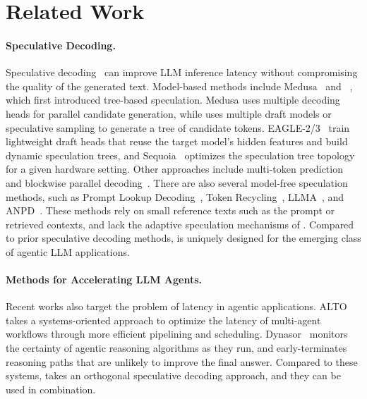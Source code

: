 \section{Related Work}
\label{suffixdecoding:sec:related}

\paragraph{Speculative Decoding.} Speculative decoding~\citep{leviathan2022fast,chen2023accelerating} can improve LLM inference latency without compromising the quality of the generated text. Model-based methods include Medusa~\citep{cai2024medusasimplellminference} and \SpecInfer~\citep{specinfer}, which first introduced tree-based speculation. Medusa uses multiple decoding heads for parallel candidate generation, while \SpecInfer uses multiple draft models or speculative sampling to generate a tree of candidate tokens. EAGLE-2/3~\citep{eagle2,li2025eagle3scalinginferenceacceleration} train lightweight draft heads that reuse the target model's hidden features and build dynamic speculation trees, and Sequoia~\citep{sequoia} optimizes the speculation tree topology for a given hardware setting. Other approaches include multi-token prediction~\citep{gloeckle2024multitoken} and blockwise parallel decoding~\citep{stern2018blockwise,kim2024accelerating}.
There are also several model-free speculation methods, such as Prompt Lookup Decoding~\citep{saxena2023prompt}, Token Recycling~\citep{luo2024turningtrashtreasureaccelerating}, LLMA~\citep{yang2023inference}, and ANPD~\citep{ou2024losslessaccelerationlargelanguage}. These methods rely on small reference texts such as the prompt or retrieved contexts, and lack the adaptive speculation mechanisms of \SuffixDecoding. Compared to prior speculative decoding methods, \SuffixDecoding is uniquely designed for the emerging class of agentic LLM applications.

\paragraph{Methods for Accelerating LLM Agents.} Recent works also target the problem of latency in agentic applications. ALTO~\citep{10.1145/3642970.3655844} takes a systems-oriented approach to optimize the latency of multi-agent workflows through more efficient pipelining and scheduling. Dynasor~\citep{fu2024efficientlyservingllmreasoning} monitors the certainty of agentic reasoning algorithms as they run, and early-terminates reasoning paths that are unlikely to improve the final answer. Compared to these systems, \SuffixDecoding takes an orthogonal speculative decoding approach, and they can be used in combination.

